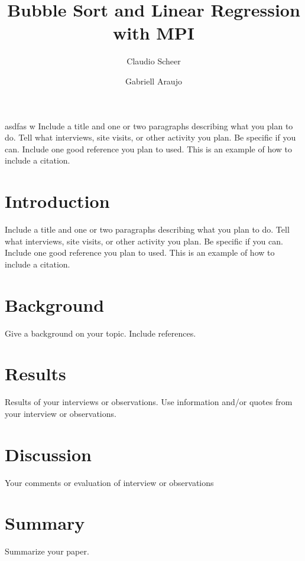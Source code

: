 \documentclass[10pt, twocolumn]{report}
\begin{document}
\title{Bubble Sort and Linear Regression with MPI}

\author[1]{Claudio Scheer}
\author[1]{Gabriell Araujo}

\maketitle

\noindent asdfas w
Include a title and one or two paragraphs describing what you plan to do. Tell what interviews, site visits, or other activity you plan. Be specific if you can. Include  one good reference you plan to used. This is an example of how to include a citation.

\section{Introduction}
Include a title and one or two paragraphs describing what you plan to do. Tell what interviews, site visits, or other activity you plan. Be specific if you can. Include  one good reference you plan to used. This is an example of how to include a citation.

\section {Background}
Give a background on your topic. Include references.

\section{Results}
Results of your interviews or observations. Use information and/or quotes from your interview or observations.

\section{Discussion}
Your comments or evaluation of interview or observations

\section{Summary}
Summarize your paper.
\end{document}
